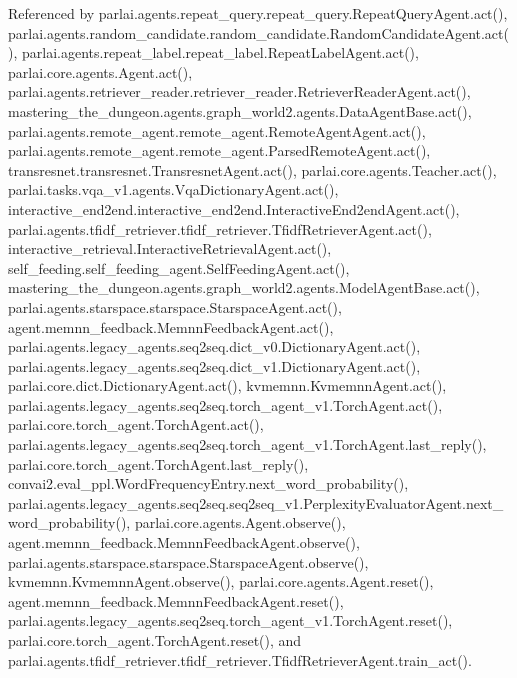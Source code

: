 Referenced by parlai.\+agents.\+repeat\+\_\+query.\+repeat\+\_\+query.\+Repeat\+Query\+Agent.\+act(), parlai.\+agents.\+random\+\_\+candidate.\+random\+\_\+candidate.\+Random\+Candidate\+Agent.\+act(), parlai.\+agents.\+repeat\+\_\+label.\+repeat\+\_\+label.\+Repeat\+Label\+Agent.\+act(), parlai.\+core.\+agents.\+Agent.\+act(), parlai.\+agents.\+retriever\+\_\+reader.\+retriever\+\_\+reader.\+Retriever\+Reader\+Agent.\+act(), mastering\+\_\+the\+\_\+dungeon.\+agents.\+graph\+\_\+world2.\+agents.\+Data\+Agent\+Base.\+act(), parlai.\+agents.\+remote\+\_\+agent.\+remote\+\_\+agent.\+Remote\+Agent\+Agent.\+act(), parlai.\+agents.\+remote\+\_\+agent.\+remote\+\_\+agent.\+Parsed\+Remote\+Agent.\+act(), transresnet.\+transresnet.\+Transresnet\+Agent.\+act(), parlai.\+core.\+agents.\+Teacher.\+act(), parlai.\+tasks.\+vqa\+\_\+v1.\+agents.\+Vqa\+Dictionary\+Agent.\+act(), interactive\+\_\+end2end.\+interactive\+\_\+end2end.\+Interactive\+End2end\+Agent.\+act(), parlai.\+agents.\+tfidf\+\_\+retriever.\+tfidf\+\_\+retriever.\+Tfidf\+Retriever\+Agent.\+act(), interactive\+\_\+retrieval.\+Interactive\+Retrieval\+Agent.\+act(), self\+\_\+feeding.\+self\+\_\+feeding\+\_\+agent.\+Self\+Feeding\+Agent.\+act(), mastering\+\_\+the\+\_\+dungeon.\+agents.\+graph\+\_\+world2.\+agents.\+Model\+Agent\+Base.\+act(), parlai.\+agents.\+starspace.\+starspace.\+Starspace\+Agent.\+act(), agent.\+memnn\+\_\+feedback.\+Memnn\+Feedback\+Agent.\+act(), parlai.\+agents.\+legacy\+\_\+agents.\+seq2seq.\+dict\+\_\+v0.\+Dictionary\+Agent.\+act(), parlai.\+agents.\+legacy\+\_\+agents.\+seq2seq.\+dict\+\_\+v1.\+Dictionary\+Agent.\+act(), parlai.\+core.\+dict.\+Dictionary\+Agent.\+act(), kvmemnn.\+Kvmemnn\+Agent.\+act(), parlai.\+agents.\+legacy\+\_\+agents.\+seq2seq.\+torch\+\_\+agent\+\_\+v1.\+Torch\+Agent.\+act(), parlai.\+core.\+torch\+\_\+agent.\+Torch\+Agent.\+act(), parlai.\+agents.\+legacy\+\_\+agents.\+seq2seq.\+torch\+\_\+agent\+\_\+v1.\+Torch\+Agent.\+last\+\_\+reply(), parlai.\+core.\+torch\+\_\+agent.\+Torch\+Agent.\+last\+\_\+reply(), convai2.\+eval\+\_\+ppl.\+Word\+Frequency\+Entry.\+next\+\_\+word\+\_\+probability(), parlai.\+agents.\+legacy\+\_\+agents.\+seq2seq.\+seq2seq\+\_\+v1.\+Perplexity\+Evaluator\+Agent.\+next\+\_\+word\+\_\+probability(), parlai.\+core.\+agents.\+Agent.\+observe(), agent.\+memnn\+\_\+feedback.\+Memnn\+Feedback\+Agent.\+observe(), parlai.\+agents.\+starspace.\+starspace.\+Starspace\+Agent.\+observe(), kvmemnn.\+Kvmemnn\+Agent.\+observe(), parlai.\+core.\+agents.\+Agent.\+reset(), agent.\+memnn\+\_\+feedback.\+Memnn\+Feedback\+Agent.\+reset(), parlai.\+agents.\+legacy\+\_\+agents.\+seq2seq.\+torch\+\_\+agent\+\_\+v1.\+Torch\+Agent.\+reset(), parlai.\+core.\+torch\+\_\+agent.\+Torch\+Agent.\+reset(), and parlai.\+agents.\+tfidf\+\_\+retriever.\+tfidf\+\_\+retriever.\+Tfidf\+Retriever\+Agent.\+train\+\_\+act().

